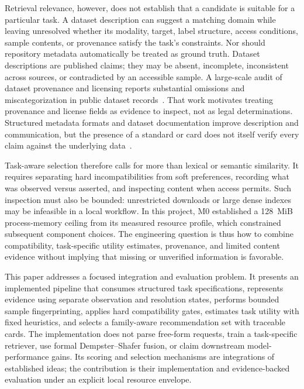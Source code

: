 \documentclass[conference]{IEEEtran}
\begin{document}
Retrieval relevance, however, does not establish that a candidate is suitable for a particular task. A dataset description can suggest a matching domain while leaving unresolved whether its modality, target, label structure, access conditions, sample contents, or provenance satisfy the task's constraints. Nor should repository metadata automatically be treated as ground truth. Dataset descriptions are published claims; they may be absent, incomplete, inconsistent across sources, or contradicted by an accessible sample. A large-scale audit of dataset provenance and licensing reports substantial omissions and miscategorization in public dataset records~\cite{longpre2023dataprovenance}. That work motivates treating provenance and license fields as evidence to inspect, not as legal determinations. Structured metadata formats and dataset documentation improve description and communication, but the presence of a standard or card does not itself verify every claim against the underlying data~\cite{akhtar2024croissant,pushkarna2022datacards}.

Task-aware selection therefore calls for more than lexical or semantic similarity. It requires separating hard incompatibilities from soft preferences, recording what was observed versus asserted, and inspecting content when access permits. Such inspection must also be bounded: unrestricted downloads or large dense indexes may be infeasible in a local workflow. In this project, M0 established a 128~MiB process-memory ceiling from its measured resource profile, which constrained subsequent component choices. The engineering question is thus how to combine compatibility, task-specific utility estimates, provenance, and limited content evidence without implying that missing or unverified information is favorable.

This paper addresses a focused integration and evaluation problem. It presents an implemented pipeline that consumes structured task specifications, represents evidence using separate observation and resolution states, performs bounded sample fingerprinting, applies hard compatibility gates, estimates task utility with fixed heuristics, and selects a family-aware recommendation set with traceable cards. The implementation does not parse free-form requests, train a task-specific retriever, use formal Dempster--Shafer fusion, or claim downstream model-performance gains. Its scoring and selection mechanisms are integrations of established ideas; the contribution is their implementation and evidence-backed evaluation under an explicit local resource envelope.
\end{document}
